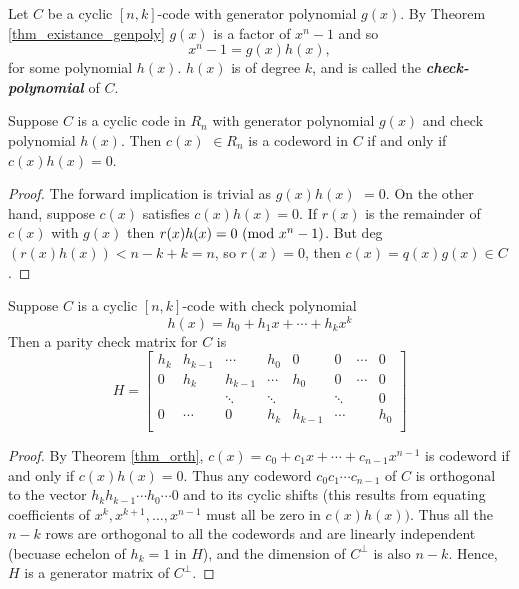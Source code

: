 \documentclass[../main.tex]{subfiles}
\newcommand{\poly}[1]{$#1(x)$}
\begin{document}
\begin{defn}
	Let $C$ be a cyclic $[n,k]$-code with generator polynomial $g(x)$. By Theorem \ref{thm_existance_genpoly} \poly{g} is a factor of $x^n - 1$ and so
	\[
		x^n - 1 = g(x)h(x),
	\]
	for some polynomial $h(x)$. \poly{h} is of degree $k$, and is called the \textbf{\emph{check-polynomial}} of $C$.
\end{defn}

\begin{thm}\label{thm_orth}
	Suppose $C$ is a cyclic code in $R_n$ with generator polynomial \poly{g} and check polynomial \poly{h}. Then \poly{c} $\in R_n$ is a codeword in $C$ if and only if $c(x)h(x)=0$.
\end{thm}

\begin{proof}
	The forward implication is trivial as \poly{g}\poly{h} $=0$. On the other hand, suppose $c(x)$ satisfies $c(x)h(x) = 0$. If \poly{r} is the remainder of \poly{c} with \poly{g} then $r(x)h(x) = 0\ (\mathrm{mod}\ x^n-1)$. But deg $(r(x)h(x)) < n - k + k = n$, so $r(x) = 0$, then $c(x) = q(x)g(x) \in C$.
\end{proof}

\begin{thm}
	Suppose $C$ is a cyclic $[n,k]$-code with check polynomial
	\[
		h(x) = h_0 + h_1x + \cdots + h_kx^k
	\]
	Then a parity check matrix for $C$ is
	\[
		H = 
		\begin{bmatrix}
			h_k & h_{k-1} & \cdots & h_0 & 0 & 0 & \cdots & 0 \\
			0 & h_k & h_{k-1} & \cdots & h_0 & 0 & \cdots & 0 \\
			& & \ddots & \ddots & & \ddots & & 0 \\
			0 & \cdots & 0 & h_k & h_{k-1} & \cdots &  & h_0 \\
		\end{bmatrix}
	\]
\end{thm}

\begin{proof}
	By Theorem \ref{thm_orth}, \poly{c}$= c_0 + c_1x + \cdots + c_{n-1}x^{n-1}$ is codeword if and only if $c(x)h(x)=0$. Thus any codeword $c_0c_1\cdots c_{n-1}$ of $C$ is orthogonal to the vector $h_kh_{k-1}\cdots h_0\cdots 0$ and to its cyclic shifts (this results from equating coefficients of $x^k, x^{k+1}, \ldots, x^{n-1}$ must all be zero in $c(x)h(x))$. Thus all the $n-k$ rows are orthogonal to all the codewords and are linearly independent (becuase echelon of $h_k = 1$ in $H$), and the dimension of $C^{\perp}$ is also $n-k$. Hence, $H$ is a generator matrix of $C^{\perp}$.  
\end{proof}
\end{document}
